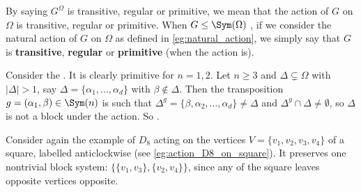 By saying $G^\Omega$ is transitive, regular or primitive, we mean that the action of $G$ on $\Omega$ is transitive, regular or primitive. When $G \leq \Sym(\Omega)$ , if we consider the natural action of $G$ on $\Omega$ as defined in \autoref{eg:natural_action}, we simply say that $G$ is \textbf{transitive}, \textbf{regular} or \textbf{primitive} (when the action is).


\begin{example}\label{eg:natural_action_Sn_blocks}
    Consider the . It is clearly primitive for $n = 1,2$. Let $n \geq 3$ and $\Delta \subsetneq \Omega$ with $|\Delta| > 1$, say $\Delta = \{\alpha_1,\dotsc,\alpha_d\}$ with $\beta \not\in \Delta$. Then the transposition $g = (\alpha_1,\beta) \in \Sym(n)$ is such that $\Delta^g = \{\beta,\alpha_2,\dotsc,\alpha_d\} \neq \Delta$ and $\Delta^g \cap \Delta \neq \emptyset$, so $\Delta$ is not a block under the action. So .
\end{example}

\begin{example}\label{eg:action_D8_on_square_blocks}
    Consider again the example of $D_8$ acting  on the vertices $V = \{v_1,v_2,v_3,v_4\}$ of a square, labelled anticlockwise (see \autoref{eg:action_D8_on_square}). It preserves one nontrivial block system: $\{\{v_1,v_3\},\{v_2,v_4\}\}$, since any  of the square leaves opposite vertices opposite. 
\end{example}

